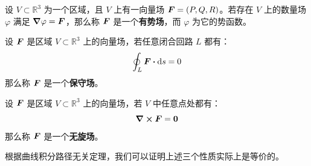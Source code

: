 \begin{definition}
	设 $V \subset \mathbb{R}^{3}$ 为一个区域，且 $V$ 上有一向量场 $\boldsymbol{F} = (P, Q, R)$。若存在 $V$ 上的数量场 $\varphi$ 满足 $\grad \varphi = \boldsymbol{F}$，那么称 $\boldsymbol{F}$ 是一个\textbf{有势场}，而 $\varphi$ 为它的势函数。
\end{definition}

\begin{definition}
	设 $\boldsymbol{F}$ 是区域 $V \subset \mathbb{R}^3$ 上的向量场，若任意闭合回路 $L$ 都有：
	$$
	\oint_L \vect{F} \vdot \dd{s} = 0
	$$
	那么称 $\boldsymbol{F}$ 是一个\textbf{保守场}。
\end{definition}

\begin{definition}
	设 $\boldsymbol{F}$ 是区域 $V \subset \mathbb{R}^3$ 上的向量场，若 $V$ 中任意点处都有：
	$$
	\curl \boldsymbol{F} = \boldsymbol{0}
	$$
	那么称 $\boldsymbol{F}$ 是一个\textbf{无旋场}。
\end{definition}

根据曲线积分路径无关定理，我们可以证明上述三个性质实际上是等价的。
